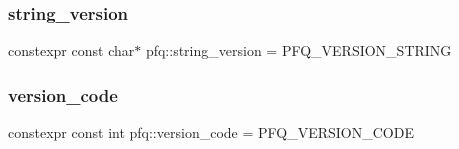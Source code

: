 \subsubsection{\texorpdfstring{string\+\_\+version}{string\_version}}
{\footnotesize\ttfamily constexpr const char$\ast$ pfq\+::string\+\_\+version = P\+F\+Q\+\_\+\+V\+E\+R\+S\+I\+O\+N\+\_\+\+S\+T\+R\+I\+NG}

\mbox{\label{namespacepfq_a7a40dd66aee22cafaf240382a6d965ab}} 
\subsubsection{\texorpdfstring{version\+\_\+code}{version\_code}}
{\footnotesize\ttfamily constexpr const int pfq\+::version\+\_\+code = P\+F\+Q\+\_\+\+V\+E\+R\+S\+I\+O\+N\+\_\+\+C\+O\+DE}

